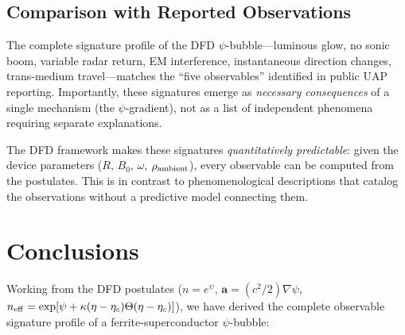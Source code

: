 \documentclass[11pt]{article}
\newcommand{\etac}{\eta_c}
\newcommand{\neff}{n_{\rm eff}}
\begin{document}
\subsection{Comparison with Reported Observations}

The complete signature profile of the DFD $\psi$-bubble---luminous glow,
no sonic boom, variable radar return, EM interference, instantaneous
direction changes, trans-medium travel---matches the ``five observables''
identified in public UAP reporting. Importantly, these signatures emerge
as \emph{necessary consequences} of a single mechanism (the $\psi$-gradient),
not as a list of independent phenomena requiring separate explanations.

The DFD framework makes these signatures \emph{quantitatively predictable}:
given the device parameters ($R$, $B_0$, $\omega$, $\rho_{\rm ambient}$),
every observable can be computed from the postulates. This is in contrast
to phenomenological descriptions that catalog the observations without
a predictive model connecting them.


\section{Conclusions}\label{sec:conclusions}

Working from the DFD postulates ($n = e^\psi$,
$\mathbf{a} = (c^2/2)\nabla\psi$, $\neff = \exp[\psi + \kappa(\eta - \etac)
\Theta(\eta - \etac)]$), we have derived the complete observable signature
profile of a ferrite-superconductor $\psi$-bubble:
\end{document}
